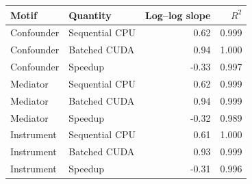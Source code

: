 \begin{tabular}{llrr}
\toprule
Motif & Quantity & Log--log slope & $R^2$ \\
\midrule
Confounder & Sequential CPU & 0.62 & 0.999 \\
Confounder & Batched CUDA & 0.94 & 1.000 \\
Confounder & Speedup & -0.33 & 0.997 \\
Mediator & Sequential CPU & 0.62 & 0.999 \\
Mediator & Batched CUDA & 0.94 & 0.999 \\
Mediator & Speedup & -0.32 & 0.989 \\
Instrument & Sequential CPU & 0.61 & 1.000 \\
Instrument & Batched CUDA & 0.93 & 0.999 \\
Instrument & Speedup & -0.31 & 0.996 \\
\bottomrule
\end{tabular}
